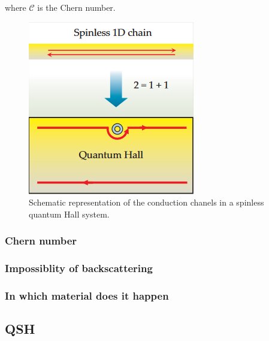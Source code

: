 where $\mathcal{C}$ is the Chern number.

\begin{figure}[h!]
    \includegraphics[scale = 0.7]{sections/visuel/spinless.png}
    \caption{Schematic representation of the conduction chanels in a spinless quantum Hall system.\cite{qi_quantum_2010}}
    \label{spinless}
\end{figure}



\subsubsection{Chern number}




\subsubsection{Impossiblity of backscattering}

\subsubsection{In which material does it happen}


\subsection{QSH}

